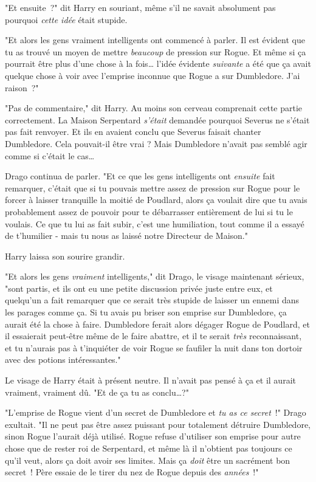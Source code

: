 "Et ensuite~?" dit Harry en souriant, même s'il ne savait absolument pas pourquoi \emph{cette idée} était stupide.

"Et alors les gens vraiment intelligents ont commencé à parler. Il est évident que tu as trouvé un moyen de mettre \emph{beaucoup} de pression sur Rogue. Et même si ça pourrait être plus d'une chose à la fois… l'idée évidente \emph{suivante} a été que ça avait quelque chose à voir avec l'emprise inconnue que Rogue a sur Dumbledore. J'ai raison~?"

"Pas de commentaire," dit Harry. Au moins son cerveau comprenait cette partie correctement. La Maison Serpentard \emph{s'était} demandée pourquoi Severus ne s'était pas fait renvoyer. Et ils en avaient conclu que Severus faisait chanter Dumbledore. Cela pouvait-il être vrai ? Mais Dumbledore n'avait pas semblé agir comme si c'était le cas…

Drago continua de parler. "Et ce que les gens intelligents ont \emph{ensuite} fait remarquer, c'était que si tu pouvais mettre assez de pression sur Rogue pour le forcer à laisser tranquille la moitié de Poudlard, alors ça voulait dire que tu avais probablement assez de pouvoir pour te débarrasser entièrement de lui si tu le voulais. Ce que tu lui as fait subir, c'est une humiliation, tout comme il a essayé de t'humilier - mais tu nous as laissé notre Directeur de Maison."

Harry laissa son sourire grandir.

"Et alors les gens \emph{vraiment} intelligents," dit Drago, le visage maintenant sérieux, "sont partis, et ils ont eu une petite discussion privée juste entre eux, et quelqu'un a fait remarquer que ce serait très stupide de laisser un ennemi dans les parages comme ça. Si tu avais pu briser son emprise sur Dumbledore, ça aurait été la chose à faire. Dumbledore ferait alors dégager Rogue de Poudlard, et il essaierait peut-être même de le faire abattre, et il te serait \emph{très} reconnaissant, et tu n'aurais pas à t'inquiéter de voir Rogue se faufiler la nuit dans ton dortoir avec des potions intéressantes."

Le visage de Harry était à présent neutre. Il n'avait pas pensé à ça et il aurait vraiment, vraiment dû. "Et de ça tu as conclu…?"

"L'emprise de Rogue vient d'un secret de Dumbledore et \emph{tu as ce secret}~!" Drago exultait. "Il ne peut pas être assez puissant pour totalement détruire Dumbledore, sinon Rogue l'aurait déjà utilisé. Rogue refuse d'utiliser son emprise pour autre chose que de rester roi de Serpentard, et même là il n'obtient pas toujours ce qu'il veut, alors ça doit avoir ses limites. Mais ça \emph{doit} être un sacrément bon secret~! Père essaie de le tirer du nez de Rogue depuis des \emph{années}~!"


